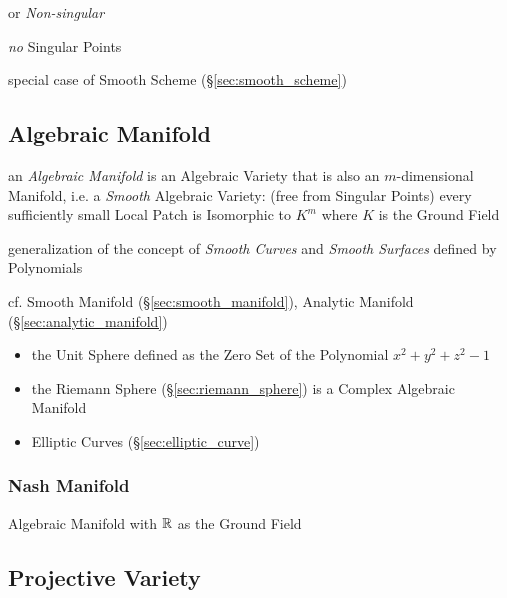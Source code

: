 or \emph{Non-singular}

\emph{no} Singular Points

special case of Smooth Scheme (\S\ref{sec:smooth_scheme})



\subsection{Algebraic Manifold}\label{sec:algebraic_manifold}

an \emph{Algebraic Manifold} is an Algebraic Variety that is also an
$m$-dimensional Manifold, i.e. a \emph{Smooth} Algebraic Variety:
(free from Singular Points) every sufficiently small Local Patch is Isomorphic
to $K^m$ where $K$ is the Ground Field

generalization of the concept of \emph{Smooth Curves} and \emph{Smooth
  Surfaces} defined by Polynomials

cf. Smooth Manifold (\S\ref{sec:smooth_manifold}), Analytic Manifold
(\S\ref{sec:analytic_manifold})

\begin{itemize}
  \item the Unit Sphere defined as the Zero Set of the Polynomial
    $x^2 + y^2 + z^2 - 1$
  \item the Riemann Sphere (\S\ref{sec:riemann_sphere}) is a Complex Algebraic
    Manifold
  \item Elliptic Curves (\S\ref{sec:elliptic_curve})
\end{itemize}



\subsubsection{Nash Manifold}\label{sec:nash_manifold}

Algebraic Manifold with $\mathbb{R}$ as the Ground Field



\subsection{Projective Variety}\label{sec:projective_variety}

